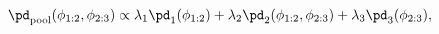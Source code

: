 \begin{equation}
  \pd_{\text{pool}}(\phi_{1:2}, \phi_{2:3}) \propto 
    \lambda_{1} \pd_{1}(\phi_{1:2}) + 
    \lambda_{2} \pd_{2}(\phi_{1:2}, \phi_{2:3}) + 
    \lambda_{3} \pd_{3}(\phi_{2:3}),  
  \label{eqn:linear-pooling}
\end{equation}